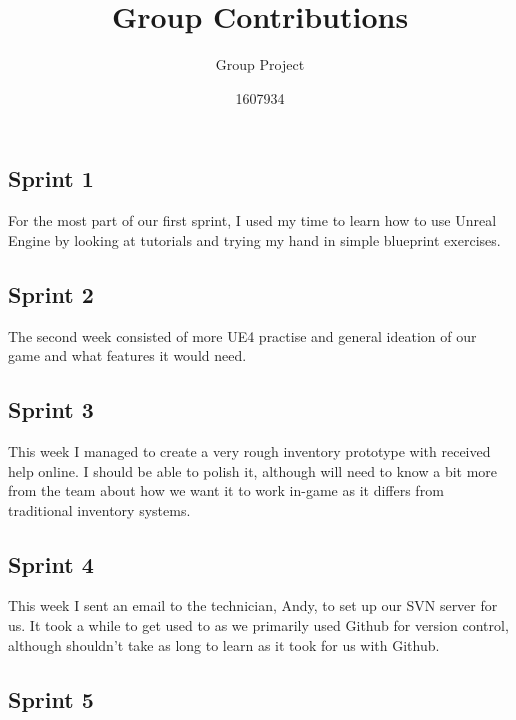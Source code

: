 \documentclass{scrartcl}
\title{Group Contributions}
\subtitle{Group Project}
\author{1607934}
\begin{document}
\maketitle


\newpage
\clearpage

\section*{}


\subsection*{Sprint 1}

For the most part of our first sprint, I used my time to learn how to use Unreal Engine by looking at tutorials and trying my hand in simple blueprint exercises. 

\subsection*{Sprint 2}

The second week consisted of more UE4 practise and general ideation of our game and what features it would need.

\subsection*{Sprint 3}

This week I managed to create a very rough inventory prototype with received help online. I should be able to polish it, although will need to know a bit more from the team about how we want it to work in-game as it differs from traditional inventory systems.

\subsection*{Sprint 4}

This week I sent an email to the technician, Andy, to set up our SVN server for us. It took a while to get used to as we primarily used Github for version control, although shouldn't take as long to learn as it took for us with Github.

\subsection*{Sprint 5}
\end{document}
